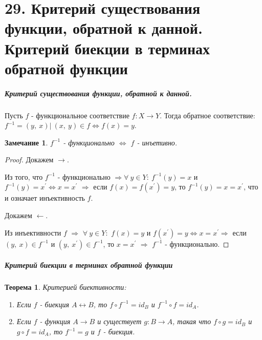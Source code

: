 \documentclass[a4paper,12pt]{article}
\newtheorem*{theorem}{Теорема}
\newtheorem*{Note}{Замечание}
\newcommand{\p}{^{\prime}}
\begin{document}
        \section*{29. Критерий существования функции, обратной к данной. Критерий биекции в терминах обратной функции}

        \subparagraph{Критерий существования функции, обратной к данной.}
        Пусть $f$ - функциональное соответствие $f:X \rightarrow Y$. Тогда обратное соответствие: $f^{-1} = {(y,\ x)|\ (x,\ y) \in f \Leftrightarrow f(x) = y}$.

        \begin{Note} $f^{-1}$ - функционально $\Leftrightarrow$ $f$ - инъетивно.
        \end{Note}

        \begin{proof}

        Докажем $\rightarrow$. 

        Из того, что $f^{-1}$ - функционально $\Rightarrow \forall\ y \in Y:\ f^{-1}(y) = x$ и $f^{-1}(y) = x\p \Leftrightarrow x = x\p$ $\Rightarrow$ если $f(x) = f(x\p) = y$, то $f^{-1}(y) = x = x\p$, что и означает инъективность $f$. 

        Докажем $\leftarrow$.

        Из инъективности $f$ $\Rightarrow$ $\forall\ y \in Y:$  $f(x) = y$ и $f(x\p) = y \Leftrightarrow x = x\p \Rightarrow$ если $(y,\ x) \in f^{-1}$ и $(y,\ x\p) \in f^{-1}$, то $x = x\p$ $\Rightarrow$ $f^{-1}$ - функционально.
        \end{proof} 

        \subparagraph{Критерий биекции в терминах обратной функции}
        \begin{theorem} Критерией биективности:
            \begin{enumerate}
                \item Если $f$ - биекция $A \leftrightarrow B$, 
                то $f \circ f^{-1} = id_B$ и
                            $f^{-1} \circ f = id_A$.       
                \item Если $f$ - функция $A \rightarrow B$ и существует $g: B \rightarrow A$, такая что $f \circ g = id_B$ и $g \circ f = id_A$, то $f^{-1} = g$ и $f$ - биекция.    
            \end{enumerate} 
        \end{theorem}
\end{document}
